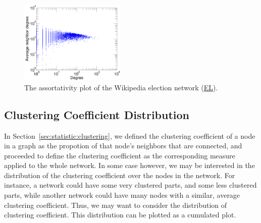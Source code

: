 \documentclass{article}
\newcommand{\wPlot}{0.45\textwidth}
\begin{document}
\begin{figure}
  \centering
  \includegraphics[width=\wPlot]{plot/assortativity.a.elec}
  \caption{
    The assortativity plot of the Wikipedia election network 
    (\href{http://konect.cc/networks/elec/}{\textsf{EL}}).
    \label{fig:assortativity}
  }
\end{figure}

\subsection{Clustering Coefficient Distribution}
In Section~\ref{sec:statistic:clustering}, we defined the clustering
coefficient of a node in a graph as the propotion of that node's
neighbors that are connected, and proceeded to define the clustering
coefficient as the corresponding measure applied to the whole network.
In some case however, we may be interested in the distribution of the
clustering coefficient over the nodes in the network.  For instance, a
network could have some very clustered parts, and some less clustered
parts, while another network could have many nodes with a similar,
average clustering coefficient.  Thus, we may want to consider the
distribution of clustering coefficient.  This distribution can be
plotted as a cumulated plot.
\end{document}
